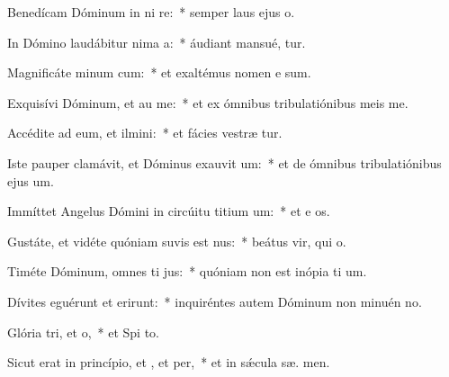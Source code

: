\item Benedícam Dóminum in ni re:~* semper laus ejus   o.
\item In Dómino laudábitur nima a:~* áudiant mansué,  tur.
\item Magnificáte minum cum:~* et exaltémus nomen e  sum.
\item Exquisívi Dóminum, et au me:~* et ex ómnibus tribulatiónibus meis  me.
\item Accédite ad eum, et ilmini:~* et fácies vestræ  tur.
\item Iste pauper clamávit, et Dóminus exauvit um:~* et de ómnibus tribulatiónibus ejus  um.
\item Immíttet Angelus Dómini in circúitu titium um:~* et e os.
\item Gustáte, et vidéte quóniam suvis est nus:~* beátus vir, qui   o.
\item Timéte Dóminum, omnes ti jus:~* quóniam non est inópia ti um.
\item Dívites eguérunt et erirunt:~* inquiréntes autem Dóminum non minuén  no.
\item Glória tri, et o,~* et Spi to.
\item Sicut erat in princípio, et , et per,~* et in sǽcula sæ. men.
